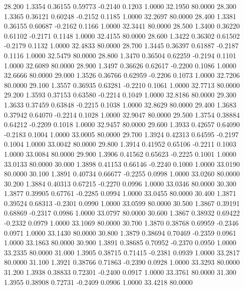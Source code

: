   28.200   1.3354   0.36155   0.59773  -0.2140   0.1203   1.0000  32.1950  80.0000
  28.300   1.3365   0.36121   0.60248  -0.2152   0.1185   1.0000  32.2697  80.0000
  28.400   1.3381   0.36155   0.60687  -0.2162   0.1166   1.0000  32.3441  80.0000
  28.500   1.3400   0.36220   0.61102  -0.2171   0.1148   1.0000  32.4155  80.0000
  28.600   1.3422   0.36302   0.61502  -0.2179   0.1132   1.0000  32.4833  80.0000
  28.700   1.3445   0.36397   0.61887  -0.2187   0.1116   1.0000  32.5479  80.0000
  28.800   1.3470   0.36504   0.62259  -0.2194   0.1101   1.0000  32.6089  80.0000
  28.900   1.3497   0.36626   0.62617  -0.2200   0.1086   1.0000  32.6666  80.0000
  29.000   1.3526   0.36766   0.62959  -0.2206   0.1073   1.0000  32.7206  80.0000
  29.100   1.3557   0.36935   0.63281  -0.2210   0.1061   1.0000  32.7713  80.0000
  29.200   1.3593   0.37153   0.63580  -0.2214   0.1049   1.0000  32.8186  80.0000
  29.300   1.3633   0.37459   0.63848  -0.2215   0.1038   1.0000  32.8629  80.0000
  29.400   1.3683   0.37942   0.64070  -0.2214   0.1028   1.0000  32.9047  80.0000
  29.500   1.3754   0.38884   0.64212  -0.2209   0.1018   1.0000  32.9457  80.0000
  29.600   1.3933   0.42657   0.64090  -0.2183   0.1004   1.0000  33.0005  80.0000
  29.700   1.3924   0.42313   0.64595  -0.2197   0.1004   1.0000  33.0042  80.0000
  29.800   1.3914   0.41952   0.65106  -0.2211   0.1003   1.0000  33.0084  80.0000
  29.900   1.3906   0.41562   0.65623  -0.2225   0.1001   1.0000  33.0133  80.0000
  30.000   1.3898   0.41153   0.66146  -0.2240   0.1000   1.0000  33.0190  80.0000
  30.100   1.3891   0.40734   0.66677  -0.2255   0.0998   1.0000  33.0260  80.0000
  30.200   1.3884   0.40313   0.67215  -0.2270   0.0996   1.0000  33.0346  80.0000
  30.300   1.3877   0.39905   0.67761  -0.2285   0.0994   1.0000  33.0455  80.0000
  30.400   1.3871   0.39524   0.68313  -0.2301   0.0990   1.0000  33.0599  80.0000
  30.500   1.3867   0.39191   0.68869  -0.2317   0.0986   1.0000  33.0797  80.0000
  30.600   1.3867   0.38932   0.69422  -0.2332   0.0979   1.0000  33.1069  80.0000
  30.700   1.3870   0.38768   0.69959  -0.2346   0.0971   1.0000  33.1430  80.0000
  30.800   1.3879   0.38694   0.70469  -0.2359   0.0961   1.0000  33.1863  80.0000
  30.900   1.3891   0.38685   0.70952  -0.2370   0.0950   1.0000  33.2335  80.0000
  31.000   1.3905   0.38715   0.71415  -0.2381   0.0939   1.0000  33.2817  80.0000
  31.100   1.3921   0.38766   0.71863  -0.2390   0.0928   1.0000  33.3293  80.0000
  31.200   1.3938   0.38833   0.72301  -0.2400   0.0917   1.0000  33.3761  80.0000
  31.300   1.3955   0.38908   0.72731  -0.2409   0.0906   1.0000  33.4218  80.0000
